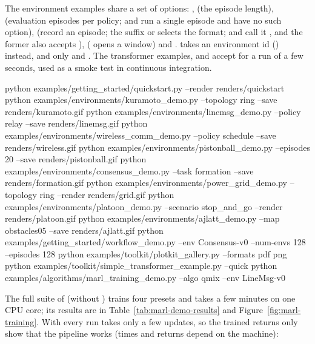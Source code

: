 The environment examples share a set of options: , 
(the episode length),  (evaluation episodes per policy;
 and  run a single episode
and have no such option),
 (record an episode; the suffix  or 
selects the format;  and  call
it , and the former also accepts ),
 ( opens a window) and
.  takes an environment id
() instead, and  only  and
. The transformer examples,
 and  accept
 for a run of a few seconds, used as a smoke test in
continuous integration.

\begin{shellcode}
python examples/getting_started/quickstart.py --render renders/quickstart
python examples/environments/kuramoto_demo.py --topology ring --save renders/kuramoto.gif
python examples/environments/linemsg_demo.py --policy relay --save renders/linemsg.gif
python examples/environments/wireless_comm_demo.py --policy schedule --save renders/wireless.gif
python examples/environments/pistonball_demo.py --episodes 20 --save renders/pistonball.gif
python examples/environments/consensus_demo.py --task formation --save renders/formation.gif
python examples/environments/power_grid_demo.py --topology ring --render renders/grid.gif
python examples/environments/platoon_demo.py --scenario stop_and_go --render renders/platoon.gif
python examples/environments/ajlatt_demo.py --map obstacles05 --save renders/ajlatt.gif
python examples/getting_started/workflow_demo.py --env Consensus-v0 --num-envs 128 --episodes 128
python examples/toolkit/plotkit_gallery.py --formats pdf png
python examples/toolkit/simple_transformer_example.py --quick
python examples/algorithms/marl_training_demo.py --algo qmix --env LineMsg-v0
\end{shellcode}

The full suite of  (without )
trains four presets and takes a few minutes on one CPU core; its results are in
Table~\ref{tab:marl-demo-results} and Figure~\ref{fig:marl-training}. With
 every run takes only a few updates, so the trained returns
only show that the pipeline works (times and returns depend on the machine):

